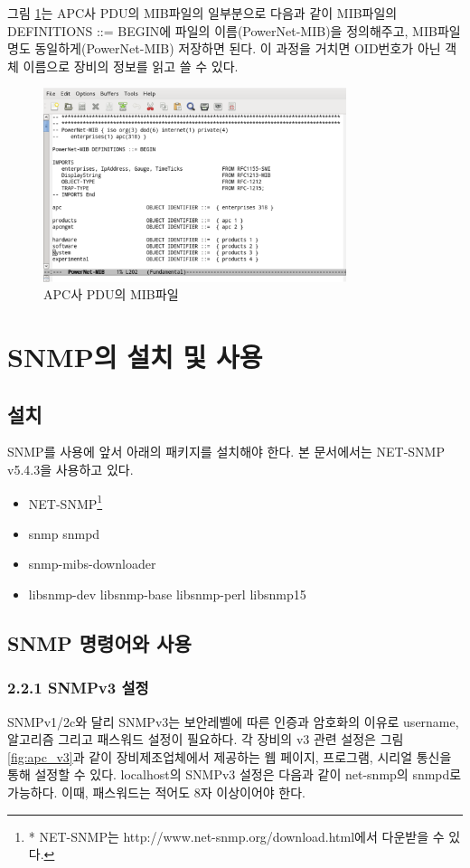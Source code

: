 \documentclass[11pt
  , a4paper
  , article
  , oneside
]{memoir}
\begin{document}
그림 \ref{fig:pdu_mib}는 APC사 PDU의 MIB파일의 일부분으로 다음과 같이 MIB파일의 DEFINITIONS ::= BEGIN에 파일의 이름(PowerNet-MIB)을 정의해주고, MIB파일명도 동일하게(PowerNet-MIB) 저장하면 된다. 이 과정을 거치면 OID번호가 아닌 객체 이름으로 장비의 정보를 읽고 쓸 수 있다. 


\begin{figure}[h]
  \centering
  \includegraphics[width=0.79\textwidth]{./images/pdu_mib.eps}
  \caption{APC사 PDU의 MIB파일}
  \label{fig:pdu_mib}   
\end{figure}


\clearpage

\chapter{SNMP의 설치 및 사용}
\section{설치}
SNMP를 사용에 앞서 아래의 패키지를 설치해야 한다. 본 문서에서는 NET-SNMP\citep{net_snmp} v5.4.3을 사용하고 있다.
\begin{itemize}
\item NET-SNMP\footnote{* NET-SNMP는 http://www.net-snmp.org/download.html에서 다운받을 수 있다.}
\item snmp snmpd
\item snmp-mibs-downloader
\item libsnmp-dev libsnmp-base libsnmp-perl libsnmp15 
\end{itemize}


\section{SNMP 명령어와 사용}

\subsection{2.2.1 SNMPv3 설정}
SNMPv1/2c와 달리 SNMPv3는 보안레벨에 따른 인증과 암호화의 이유로 username, 알고리즘 그리고 패스워드 설정이 필요하다. 각 장비의 v3 관련 설정은 그림 \ref{fig:apc_v3}과 같이 장비제조업체에서 제공하는 웹 페이지, 프로그램, 시리얼 통신을 통해 설정할 수 있다. localhost의 SNMPv3 설정은 다음과 같이 net-snmp의 snmpd로 가능하다. 이때, 패스워드는 적어도 8자 이상이어야 한다.
\end{document}

